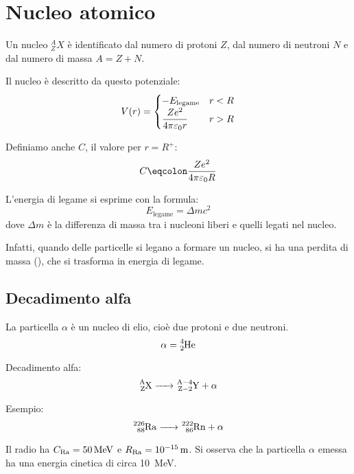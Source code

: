 \section{Nucleo atomico}

Un nucleo $_Z^A X$ è identificato dal numero di protoni $Z$, dal numero di neutroni $N$ e dal numero di massa $A = Z + N$.

Il nucleo è descritto da questo potenziale:
\begin{equation}
    V(r) = \begin{cases}
        -E_\text{legame} & r < R \\
        \dfrac{Z e^2}{4 \pi \varepsilon_0 r} & r > R \\
    \end{cases}
\end{equation}

Definiamo anche $C$, il valore per $r = R^+$:
\begin{equation}
    C \eqcolon \frac{Z e^2}{4 \pi \eps_0 R}
\end{equation}

L'energia di legame si esprime con la formula:
\begin{equation}
    E_\text{legame} = \Delta m c^2
\end{equation}
dove $\Delta m$ è la differenza di massa tra i nucleoni liberi e quelli legati nel nucleo.

Infatti, quando delle particelle si legano a formare un nucleo, si ha una perdita di massa (), che si trasforma in energia di legame.

\subsection{Decadimento alfa}

La particella $\alpha$ è un nucleo di elio, cioè due protoni e due neutroni.
\begin{equation}
    \alpha = \ce{^4_2He}
\end{equation}

Decadimento alfa:
\begin{equation}
    \ce{^{A}_{Z}X -> ^{A-4}_{Z-2}Y + \alpha}
\end{equation}

Esempio:
\begin{equation}
    \ce{^{226}_{88}Ra -> ^{222}_{86}Rn + \alpha}
\end{equation}

Il radio ha $C_{\ce{Ra}} = \qty{50}{\mega\electronvolt}$ e $R_{\ce{Ra}} = \qty{e-15}{\metre}$.
Si osserva che la particella $\alpha$ emessa ha una energia cinetica di circa \qty{10}{\mega\electronvolt}.

